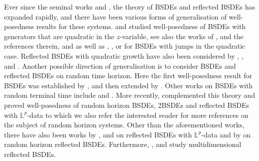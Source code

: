 \documentclass[10pt]{article} %
\def \L{\mathbb{L}}
\newcommand{\1}{\mathbf{1}}
\begin{document}
\medskip
Ever since the seminal works \cite{pardoux1990adapted} and \cite{el1997reflected}, the theory of BSDEs and reflected BSDEs has expanded rapidly, and there have been various forms of generalisation of well-posedness results for these systems. \citeauthor*{kobylanski1997resultats} \cite{kobylanski1997resultats} and \citeauthor*{tevzadze2008solvability} \cite{tevzadze2008solvability} studied well-posedness of BSDEs with generators that are quadratic in the $z$-variable, see also the works of \citeauthor*{jackson2022characterization} \cite{jackson2022characterization}, \citeauthor*{zheng2023one} \cite{zheng2023one} and the references therein, and \citeauthor*{kazi2015quadratic1} \cite{kazi2015quadratic1,kazi2016quadratic} as well as \citeauthor*{karoui2016quadratic} \cite{karoui2016quadratic}, \citeauthor*{jeanblanc2012robust} \cite{jeanblanc2012robust}, or \citeauthor*{matoussi2019exponential} \cite{matoussi2019exponential} for BSDEs with jumps in the quadratic case. Reflected BSDEs with quadratic growth have also been considered by \citeauthor*{kobylanski2002reflected} \cite{kobylanski2002reflected}, \citeauthor*{lepeltier2007reflected} \cite{lepeltier2007reflected}, and \citeauthor*{bayraktar2012quadratic} \cite{bayraktar2012quadratic}. Another possible direction of generalisation is to consider BSDEs and reflected BSDEs on random time horizon. Here the first well-posedness result for BSDEs was established by \citeauthor*{peng1991probabilistic} \cite{peng1991probabilistic}, and then extended by \citeauthor*{darling1997backwards} \cite{darling1997backwards}. Other works on BSDEs with random terminal time include \citeauthor*{briand1998stability} \cite{briand1998stability} and \citeauthor*{royer2004bsdes} \cite{royer2004bsdes}. More recently, \citeauthor*{lin2020second} \cite{lin2020second} complemented this theory and proved well-posedness of random horizon BSDEs, 2BSDEs and reflected BSDEs with $\L^p$-data to which we also refer the interested reader for more references on the subject of random horizon systems. Other than the aforementioned works, there have also been works by \citeauthor*{rozkosz2012solutions} \cite{rozkosz2012solutions}, \citeauthor*{klimsiak2012reflected2} \cite{klimsiak2012reflected2} and \citeauthor*{klimsiak2019reflected} \cite{klimsiak2019reflected} on reflected BSDEs with $\L^p$-data and by \citeauthor*{alsheyab2023optimal} \cite{alsheyab2023optimal} on random horizon reflected BSDEs. Furthermore, \citeauthor*{el2023infinite} \cite{el2023infinite}, \citeauthor*{li2023multi} \cite{li2023multi} and \citeauthor*{qian2023multi} \cite{qian2023multi} study multidimensional reflected BSDEs.
\end{document}

